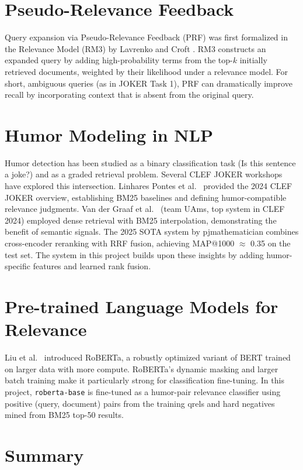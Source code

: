 \section{Pseudo-Relevance Feedback}

Query expansion via Pseudo-Relevance Feedback (PRF) was first formalized in the Relevance Model (RM3) by Lavrenko and Croft \cite{rm3}. RM3 constructs an expanded query by adding high-probability terms from the top-$k$ initially retrieved documents, weighted by their likelihood under a relevance model. For short, ambiguous queries (as in JOKER Task 1), PRF can dramatically improve recall by incorporating context that is absent from the original query.

\section{Humor Modeling in NLP}

Humor detection has been studied as a binary classification task (Is this sentence a joke?) and as a graded retrieval problem. Several CLEF JOKER workshops have explored this intersection. Linhares Pontes et al.\ \cite{joker2024} provided the 2024 CLEF JOKER overview, establishing BM25 baselines and defining humor-compatible relevance judgments. Van der Graaf et al.\ \cite{uams2024} (team UAms, top system in CLEF 2024) employed dense retrieval with BM25 interpolation, demonstrating the benefit of semantic signals. The 2025 SOTA system by pjmathematician \cite{sota2025} combines cross-encoder reranking with RRF fusion, achieving MAP@1000 $\approx$ 0.35 on the test set. The system in this project builds upon these insights by adding humor-specific features and learned rank fusion.

\section{Pre-trained Language Models for Relevance}

Liu et al.\ \cite{roberta} introduced RoBERTa, a robustly optimized variant of BERT \cite{bert} trained on larger data with more compute. RoBERTa's dynamic masking and larger batch training make it particularly strong for classification fine-tuning. In this project, \texttt{roberta-base} is fine-tuned as a humor-pair relevance classifier using positive (query, document) pairs from the training qrels and hard negatives mined from BM25 top-50 results.

\section{Summary}

